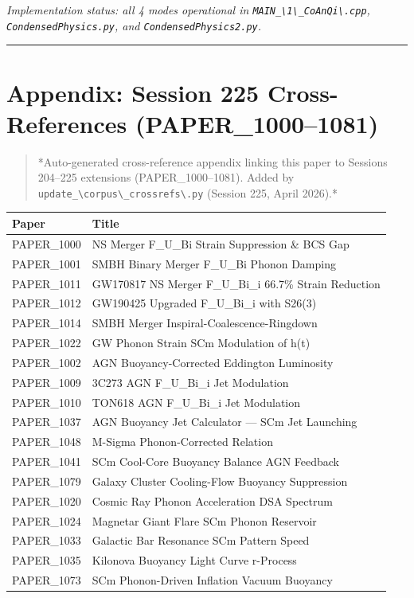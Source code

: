 \documentclass[12pt,a4paper]{article}
\begin{document}
\emph{Implementation status: all 4 modes operational in \texttt{MAIN\_\textbackslash {1\textbackslash \_CoAnQi\textbackslash }.cpp}, \texttt{CondensedPhysics.py}, and \texttt{CondensedPhysics2.py}.}

\medskip\hrule\medskip

\section{Appendix: Session 225 Cross-References (PAPER\_1000--1081)}

\begin{quote}
*Auto-generated cross-reference appendix linking this paper to
Sessions 204--225 extensions (PAPER\_1000--1081). Added by
\texttt{update\_\textbackslash {corpus\textbackslash \_crossrefs\textbackslash }.py} (Session 225, April 2026).*
\end{quote}

\begin{table}[H]
\centering
\small
\begin{tabularx}{\linewidth}{@{}>{\raggedright\arraybackslash}X>{\raggedright\arraybackslash}X@{}}
\toprule
Paper & Title \tabularnewline
\midrule
PAPER\_1000 & NS Merger F\_{U\_Bi} Strain Suppression \& BCS Gap \tabularnewline
PAPER\_1001 & SMBH Binary Merger F\_{U\_Bi} Phonon Damping \tabularnewline
PAPER\_1011 & GW170817 NS Merger F\_{U\_Bi\_i} 66.7\% Strain Reduction \tabularnewline
PAPER\_1012 & GW190425 Upgraded F\_{U\_Bi\_i} with S26(3) \tabularnewline
PAPER\_1014 & SMBH Merger Inspiral-Coalescence-Ringdown \tabularnewline
PAPER\_1022 & GW Phonon Strain SCm Modulation of h(t) \tabularnewline
PAPER\_1002 & AGN Buoyancy-Corrected Eddington Luminosity \tabularnewline
PAPER\_1009 & 3C273 AGN F\_{U\_Bi\_i} Jet Modulation \tabularnewline
PAPER\_1010 & TON618 AGN F\_{U\_Bi\_i} Jet Modulation \tabularnewline
PAPER\_1037 & AGN Buoyancy Jet Calculator --- SCm Jet Launching \tabularnewline
PAPER\_1048 & M-Sigma Phonon-Corrected Relation \tabularnewline
PAPER\_1041 & SCm Cool-Core Buoyancy Balance AGN Feedback \tabularnewline
PAPER\_1079 & Galaxy Cluster Cooling-Flow Buoyancy Suppression \tabularnewline
PAPER\_1020 & Cosmic Ray Phonon Acceleration DSA Spectrum \tabularnewline
PAPER\_1024 & Magnetar Giant Flare SCm Phonon Reservoir \tabularnewline
PAPER\_1033 & Galactic Bar Resonance SCm Pattern Speed \tabularnewline
PAPER\_1035 & Kilonova Buoyancy Light Curve r-Process \tabularnewline
PAPER\_1073 & SCm Phonon-Driven Inflation Vacuum Buoyancy \tabularnewline
\bottomrule
\end{tabularx}
\end{table}
\end{document}
